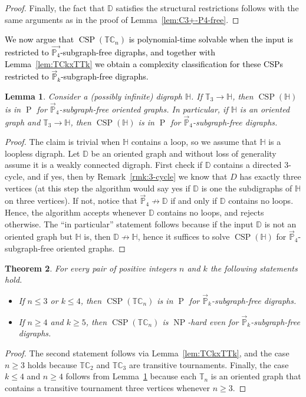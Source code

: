 \documentclass{article}
\newtheorem{theorem}{Theorem}
\newtheorem{lemma}[theorem]{Lemma}
\theoremstyle{definition}
\theoremstyle{remark}
\newcommand{\blue}[1]{\textcolor{black}{#1}}
\DeclareMathOperator{\NP}{NP}
\DeclareMathOperator{\cP}{P}
\DeclareMathOperator{\CSP}{CSP}
\newcommand{\bC}{{\mathbb C}}
\newcommand{\bD}{{\mathbb D}}
\newcommand{\bH}{{\mathbb H}}
\newcommand{\bP}{{\mathbb P}}
\newcommand{\bT}{{\mathbb T}}
\begin{document}
\begin{proof}
   Finally, the fact that $\bD$ satisfies the structural restrictions follows with the same arguments
   as in the proof of Lemma~\ref{lem:C3+-P4-free}.
\end{proof}


\blue{We now argue that $\CSP(\bT\bC_n)$ is polynomial-time solvable
when the input is restricted to $\vec{\bP_4}$-subgraph-free digraphs, and together
with Lemma~\ref{lem:TCkxTTk} we obtain a complexity classification for
these CSPs restricted to $\vec{\bP}_k$-subgraph-free digraphs.}

\begin{lemma}\label{lem:oriented-P4-subgraph-free}
    Consider a (possibly infinite) digraph $\bH$. If $\bT_3\to \bH$, then $\CSP(\bH)$ is in
    $\cP$ for $\vec{\bP}_4$-subgraph-free oriented graphs. In particular, 
    if $\bH$ is an oriented graph and $\bT_3\to \bH$, then $\CSP(\bH)$ is in
    $\cP$ for $\vec{\bP}_4$-subgraph-free digraphs.
\end{lemma}
\begin{proof}
    The claim is trivial when $\bH$ contains a loop, so we assume that 
    $\bH$ is a loopless digraph. Let $\bD$ be an oriented graph and without
    loss of generality assume it
    is a weakly connected digraph. First check if $\bD$ contains a directed
    $3$-cycle, and if yes, then by Remark~\ref{rmk:3-cycle} we know that $D$ has 
    exactly three vertices
    (at this step the algorithm would say yes if $\bD$ is one the subdigraphs
    of $\bH$ on three vertices). If not, notice that $\vec{\bP}_4\not\to\bD$
    if and only if $\bD$ contains no loops.
    Hence, the algorithm accepts whenever $\bD$ contains no loops, and rejects
    otherwise. The ``in particular''
    statement follows because if the input $\bD$ is not an oriented graph
    but $\bH$ is, then $\bD\not\to \bH$, hence it suffices to solve $\CSP(\bH)$
    for $\vec{\bP}_4$-subgraph-free oriented graphs.
\end{proof}

\begin{theorem}\label{thm:TCn-Pk-subgraph-classification}
    For every pair of positive integers $n$ and $k$ the following statements hold.
    \begin{itemize}
        \item If $n \le 3$ or $k\le 4$, then $\CSP(\bT\bC_n)$ is in $\cP$ for $\vec{\bP}_k$-subgraph-free
        digraphs.
        \item If $n \ge 4$ and $k \ge 5$, then $\CSP(\bT\bC_n)$ is $\NP$-hard even for
        $\vec{\bP}_k$-subgraph-free digraphs.
    \end{itemize}
\end{theorem}
\begin{proof}
    The second statement follows via Lemma~\ref{lem:TCkxTTk}, and the case
    $n \ge 3$ holds because $\bT\bC_2$ and $\bT\bC_3$ are transitive tournaments.
    Finally, the case $k\le 4$ and $n\ge 4$ follows from Lemma~\ref{lem:oriented-P4-subgraph-free}
    because each $\bT_n$ is an oriented graph that contains a transitive tournament
    three vertices whenever $n\ge 3$.
\end{proof}
\end{document}
